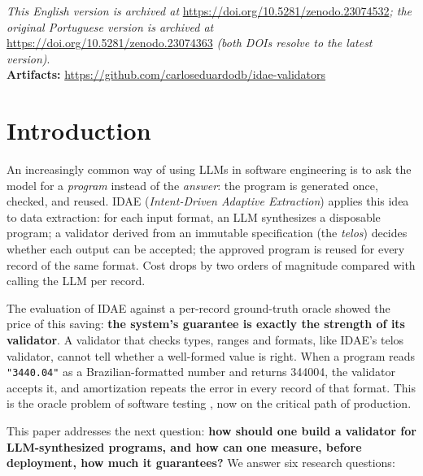 \documentclass[sigconf,nonacm]{acmart}
\begin{document}

\frenchspacing
\maketitle

\noindent\textit{This English version is archived at} \url{https://doi.org/10.5281/zenodo.23074532}\textit{; the original Portuguese version is archived at} \url{https://doi.org/10.5281/zenodo.23074363} \textit{(both DOIs resolve to the latest version)}.\\
\textbf{Artifacts:} \url{https://github.com/carloseduardodb/idae-validators}

\section{Introduction}

An increasingly common way of using LLMs in software engineering is to ask the model for a \textit{program} instead of the \textit{answer}: the program is generated once, checked, and reused. IDAE (\textit{Intent-Driven Adaptive Extraction}) \cite{batista2026idae} applies this idea to data extraction: for each input format, an LLM synthesizes a disposable program; a validator derived from an immutable specification (the \textit{telos}) decides whether each output can be accepted; the approved program is reused for every record of the same format. Cost drops by two orders of magnitude compared with calling the LLM per record.

The evaluation of IDAE against a per-record ground-truth oracle showed the price of this saving: \textbf{the system's guarantee is exactly the strength of its validator}. A validator that checks types, ranges and formats, like IDAE's telos validator, cannot tell whether a well-formed value is right. When a program reads \texttt{"3440.04"} as a Brazilian-formatted number and returns 344004, the validator accepts it, and amortization repeats the error in every record of that format. This is the oracle problem of software testing \cite{barr2015oracle}, now on the critical path of production.

This paper addresses the next question: \textbf{how should one build a validator for LLM-synthesized programs, and how can one measure, before deployment, how much it guarantees?} We answer six research questions:
\end{document}
